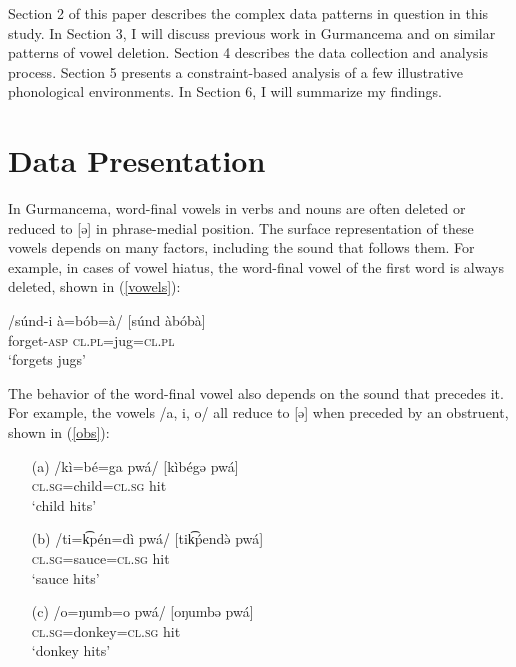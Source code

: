 \documentclass[output=paper,
modfonts
]{langscibook}
\begin{document}
Section 2 of this paper describes the complex data patterns in question in this study. In Section 3, I will discuss previous work in Gurmancema and on similar patterns 
of vowel deletion. Section 4 describes the 
data collection and analysis process. Section 5 presents a constraint-based analysis of 
a few illustrative phonological environments. In Section 6, I will summarize my findings. 

\section{Data Presentation} \label{data}
In Gurmancema, word-final vowels in verbs and nouns are often deleted or reduced to [ə] in phrase-medial position. The surface representation of these vowels depends on many factors, including the sound that follows them. For example, in cases of vowel hiatus, the word-final vowel of the first word is always deleted, shown in (\ref{vowels}):

\ea \label{vowels}
\gll /súnd-i à=bób=à/ \hspace{0.5cm} [súnd àbóbà]\\
forget-\textsc{asp} \textsc{cl.pl}=jug=\textsc{cl.pl}\\
\glt `forgets jugs'
\z

The behavior of the word-final vowel also depends on the sound that precedes it. For example, the vowels /a, i, o/ all reduce to [ə] when preceded by an obstruent, shown in (\ref{obs}):
  
\ea \label{obs}
\begin{enumerate}
\item[(a)]
\gll /kì=bé=ga pwá/  \hspace{0.5cm} [kìbégə pwá] \\
 \textsc{cl.sg}=child=\textsc{cl.sg} hit\\
\glt `child hits'

\item[(b)]
\gll /ti=k͡pén=dì pwá/ \hspace{0.5cm} [tik͡ṕendə̀ pwá]\\
\textsc{cl.sg}=sauce=\textsc{cl.sg} hit\\
\glt `sauce hits'

\item[(c)]
\gll /o=ŋumb=o pwá/ \hspace{0.4cm} [oŋumbə pwá]\\
\textsc{cl.sg}=donkey=\textsc{cl.sg} hit\\
\glt `donkey hits'

\end{enumerate}
\z
\end{document}

